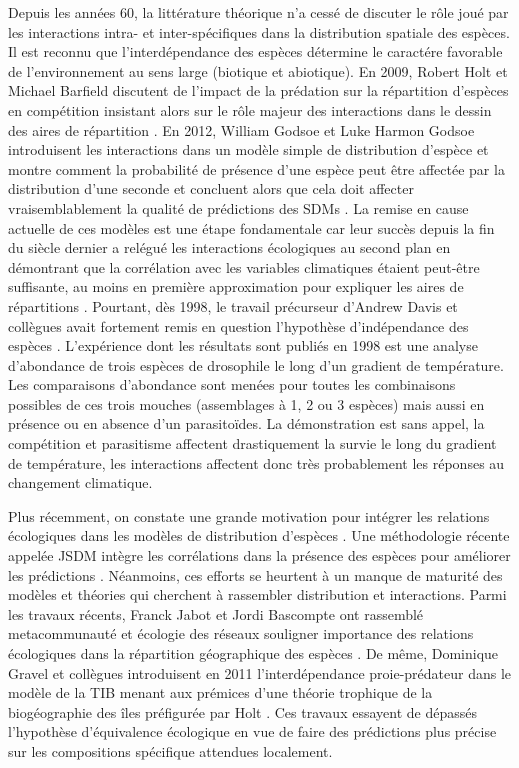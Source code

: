 Depuis les années 60, la littérature théorique n'a cessé de discuter le
rôle joué par les interactions intra- et inter-spécifiques dans la
distribution spatiale des espèces. Il est reconnu que l'interdépendance
des espèces détermine le caractére favorable de l'environnement au sens
large (biotique et abiotique). En 2009, Robert Holt et Michael Barfield
discutent de l'impact de la prédation sur la répartition d'espèces en
compétition insistant alors sur le rôle majeur des interactions dans le
dessin des aires de répartition \citep{Holt2009}. En 2012, William
Godsoe et Luke Harmon Godsoe introduisent les interactions dans un
modèle simple de distribution d'espèce et montre comment la probabilité
de présence d'une espèce peut être affectée par la distribution d'une
seconde et concluent alors que cela doit affecter vraisemblablement la
qualité de prédictions des SDMs \citep{Godsoe2012}. La remise en cause
actuelle de ces modèles est une étape fondamentale car leur succès
depuis la fin du siècle dernier a relégué les interactions écologiques
au second plan en démontrant que la corrélation avec les variables
climatiques étaient peut-être suffisante, au moins en première
approximation pour expliquer les aires de répartitions
\citep{Pearson2003}. Pourtant, dès 1998, le travail précurseur d'Andrew
Davis et collègues \citep{Davis1998} avait fortement remis en question
l'hypothèse d'indépendance des espèces \citep{Jeschke2008}. L'expérience
dont les résultats sont publiés en 1998 est une analyse d'abondance de
trois espèces de drosophile le long d'un gradient de température. Les
comparaisons d'abondance sont menées pour toutes les combinaisons
possibles de ces trois mouches (assemblages à 1, 2 ou 3 espèces) mais
aussi en présence ou en absence d'un parasitoïdes. La démonstration est
sans appel, la compétition et parasitisme affectent drastiquement la
survie le long du gradient de température, les interactions affectent
donc très probablement les réponses au changement climatique.

Plus récemment, on constate une grande motivation pour intégrer les
relations écologiques dans les modèles de distribution d'espèces
\citep[\citet{Guisan2011}]{Kissling2011}. Une méthodologie récente
appelée JSDM intègre les corrélations dans la présence des espèces pour
améliorer les prédictions \citep{Pollock2014}. Néanmoins, ces efforts se
heurtent à un manque de maturité des modèles et théories qui cherchent à
rassembler distribution et interactions. Parmi les travaux récents,
Franck Jabot et Jordi Bascompte ont rassemblé metacommunauté et écologie
des réseaux souligner importance des relations écologiques dans la
répartition géographique des espèces \citep{Jabot2012}. De même,
Dominique Gravel et collègues introduisent en 2011 l'interdépendance
proie-prédateur dans le modèle de la TIB menant aux prémices d'une
théorie trophique de la biogéographie des îles \citep{Gravel2011}
préfigurée par Holt \citep{Holt2009a}. Ces travaux essayent de dépassés
l'hypothèse d'équivalence écologique en vue de faire des prédictions
plus précise sur les compositions spécifique attendues localement.

